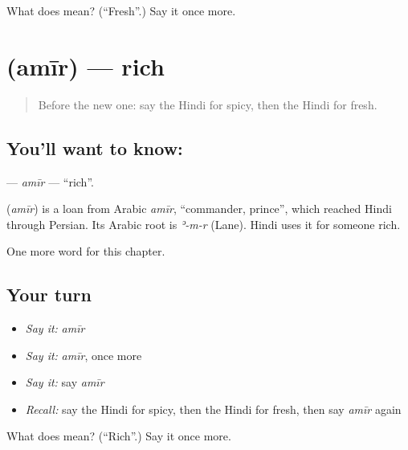 \begin{tcolorbox}[breakable,colback=teal!4,colframe=teal!35!black,title={Before you move on}]
What does  mean? (\textquotedblleft{}Fresh\textquotedblright{}.) Say it once more.
\end{tcolorbox}
\section[\texorpdfstring{\hi{अमीर} (amīr)}{अमीर (amīr)}]{ (amīr) — rich}

\label{lesson:HI-C157-amir}



\begin{quote}
Before the new one: say the Hindi for spicy, then the Hindi for fresh.
\end{quote}

\subsection*{You'll want to know: }
\textbf{} — \emph{amīr} — \textquotedblleft{}rich\textquotedblright{}.

\begin{cousinweb}
\textbf{} (\emph{amīr}) is a loan from Arabic \emph{amīr}, \textquotedblleft{}commander, prince\textquotedblright{}, which reached Hindi through Persian. Its Arabic root is \emph{ʾ-m-r} (Lane). Hindi uses it for someone rich.
\end{cousinweb}

\begin{grammarlens}[title={What you've built}]
One more word for this chapter.
\end{grammarlens}

\subsection*{Your turn}
\begin{itemize}
\raggedright
  \item \emph{Say it:} \emph{amīr}
  \item \emph{Say it:} \emph{amīr}, once more
  \item \emph{Say it:} say \emph{amīr}
  \item \emph{Recall:} say the Hindi for spicy, then the Hindi for fresh, then say \emph{amīr} again
\end{itemize}

\begin{tcolorbox}[breakable,colback=teal!4,colframe=teal!35!black,title={Before you move on}]
What does  mean? (\textquotedblleft{}Rich\textquotedblright{}.) Say it once more.
\end{tcolorbox}
